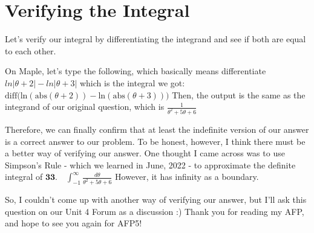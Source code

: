 \newpage
\section*{Verifying the Integral}

Let's verify our integral by 
differentiating the integrand and
see if both are equal to each other.

On Maple, let's type the following,
which basically means differentiate
$ ln|\theta + 2| - ln|\theta + 3| $ 
which is the integral we got:
$ \text{diff} \Big(
  \text{ln}(
    \text{abs}(
      \theta + 2
    )
  )
  -
  \text{ln}(
    \text{abs}(
      \theta + 3
    )
  )
\Big) $ 
Then, the output is the same as the
integrand of our original question,
which is 
$ \frac{1}{\theta^2+5\theta+6} $

Therefore, we can finally confirm
that at least the indefinite version
of our answer is a correct answer
to our problem. To be honest,
however,  I think there must be a
better way of verifying our answer.
One thought I came across was to use
Simpson's Rule - which we learned
in June, 2022 - to approximate
the definite integral of
$ \textbf{33.}\quad \int_{-1}^{\infty} 
\frac{d\theta}{\theta^2+5\theta+6} $
However, it has infinity as a boundary.

So, I couldn't come up with
another way of verifying our answer,
but I'll ask this question on
our Unit 4 Forum as a discussion :)
Thank you for reading my AFP, and
hope to see you again for AFP5!

